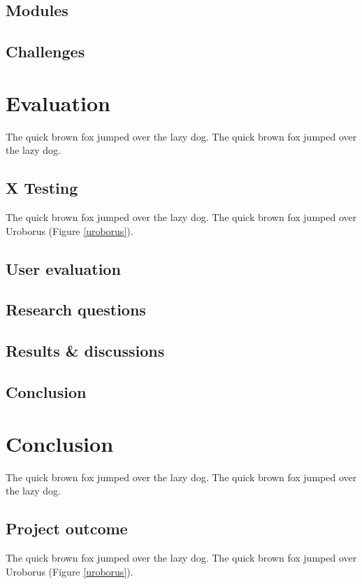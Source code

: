\documentclass{l4proj}
\begin{document}
\section{Modules}

\section{Challenges}

\chapter{Evaluation}
The quick brown fox jumped over the lazy dog.
The quick brown fox jumped over the lazy dog.

\section{X Testing}
The quick brown fox jumped over the lazy dog.
The quick brown fox jumped over Uroborus (Figure \ref{uroborus}).

\section{User evaluation}

\section{Research questions}

\section{Results \& discussions}

\section{Conclusion}

\chapter{Conclusion}
The quick brown fox jumped over the lazy dog.
The quick brown fox jumped over the lazy dog.

\section{Project outcome}
The quick brown fox jumped over the lazy dog.
The quick brown fox jumped over Uroborus (Figure \ref{uroborus}).
\end{document}
